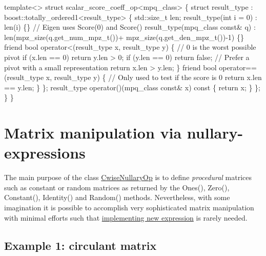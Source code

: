 \begin{DoxyCode}
    \textcolor{keyword}{template}<> \textcolor{keyword}{struct }scalar\_score\_coeff\_op<mpq\_class> \{
      \textcolor{keyword}{struct }result\_type : boost::totally\_ordered1<result\_type> \{
        std::size\_t len;
        result\_type(\textcolor{keywordtype}{int} i = 0) : len(i) \{\} \textcolor{comment}{// Eigen uses Score(0) and Score()}
        result\_type(mpq\_class \textcolor{keyword}{const}& q) :
          len(mpz\_size(q.get\_num\_mpz\_t())+
              mpz\_size(q.get\_den\_mpz\_t())-1) \{\}
        \textcolor{keyword}{friend} \textcolor{keywordtype}{bool} operator<(result\_type x, result\_type y) \{
          \textcolor{comment}{// 0 is the worst possible pivot}
          \textcolor{keywordflow}{if} (x.len == 0) \textcolor{keywordflow}{return} y.len > 0;
          \textcolor{keywordflow}{if} (y.len == 0) \textcolor{keywordflow}{return} \textcolor{keyword}{false};
          \textcolor{comment}{// Prefer a pivot with a small representation}
          \textcolor{keywordflow}{return} x.len > y.len;
        \}
        \textcolor{keyword}{friend} \textcolor{keywordtype}{bool} operator==(result\_type x, result\_type y) \{
          \textcolor{comment}{// Only used to test if the score is 0}
          \textcolor{keywordflow}{return} x.len == y.len;
        \}
      \};
      result\_type operator()(mpq\_class \textcolor{keyword}{const}& x)\textcolor{keyword}{ const }\{ \textcolor{keywordflow}{return} x; \}
    \};
  \}
\}
\end{DoxyCode}
 \hypertarget{TopicCustomizing_NullaryExpr}{}\section{Matrix manipulation via nullary-\/expressions}\label{TopicCustomizing_NullaryExpr}
The main purpose of the class \hyperlink{group___core___module_class_eigen_1_1_cwise_nullary_op}{Cwise\+Nullary\+Op} is to define {\itshape procedural} matrices such as constant or random matrices as returned by the Ones(), Zero(), Constant(), Identity() and Random() methods. Nevertheless, with some imagination it is possible to accomplish very sophisticated matrix manipulation with minimal efforts such that \hyperlink{TopicNewExpressionType}{implementing new expression} is rarely needed.\hypertarget{_topic_customizing__nullary_expr_NullaryExpr_Circulant}{}\subsection{Example 1\+: circulant matrix}\label{_topic_customizing__nullary_expr_NullaryExpr_Circulant}
